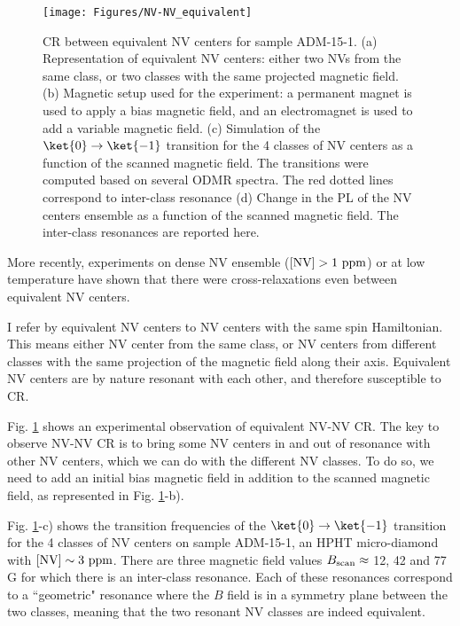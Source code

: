 \documentclass[a4paper,11pt]{report}
\begin{document}
\begin{figure}[h]
\centering
\texttt{[image: Figures/NV-NV\_equivalent]}
\caption{CR between equivalent NV centers for sample ADM-15-1. (a) Representation of equivalent NV centers: either two NVs from the same class, or two classes with the same projected magnetic field. (b) Magnetic setup used for the experiment: a permanent magnet is used to apply a bias magnetic field, and an electromagnet is used to add a variable magnetic field. (c) Simulation of the $\ket{0}\to\ket{-1}$ transition for the 4 classes of NV centers as a function of the scanned magnetic field. The transitions were computed based on several ODMR spectra. The red dotted lines correspond to inter-class resonance (d) Change in the PL of the NV centers ensemble as a function of the scanned magnetic field. The inter-class resonances are reported here.}
\label{equivalent NV-NV}
\end{figure}

More recently, experiments \citep{jarmola2012temperature, mrozek2015longitudinal, jarmola2015longitudinal, choi2017depolarization} on dense NV ensemble ($[\rm NV ] >1\ \rm ppm$) or at low temperature have shown that there were cross-relaxations even between equivalent NV centers.

I refer by equivalent NV centers to NV centers with the same spin Hamiltonian. This means either NV center from the same class, or NV centers from different classes with the same projection of the magnetic field along their axis. Equivalent NV centers are by nature resonant with each other, and therefore susceptible to CR.

Fig. \ref{equivalent NV-NV} shows an experimental observation of equivalent NV-NV CR. The key to observe NV-NV CR is to bring some NV centers in and out of resonance with other NV centers, which we can do with the different NV classes. To do so, we need to add an initial bias magnetic field in addition to the scanned magnetic field, as represented in Fig. \ref{equivalent NV-NV}-b). %

Fig. \ref{equivalent NV-NV}-c) shows the transition frequencies of the $\ket{0}\to\ket{-1}$ transition for the 4 classes of NV centers on sample ADM-15-1, an HPHT micro-diamond with $[\rm NV]\sim 3\ \rm ppm$. There are three magnetic field values $B_{\rm scan} \approx$ 12, 42 and 77 G for which there is an inter-class resonance. Each of these resonances correspond to a ``geometric" resonance where the $B$ field is in a symmetry plane between the two classes, meaning that the two resonant NV classes are indeed equivalent.
\end{document}
